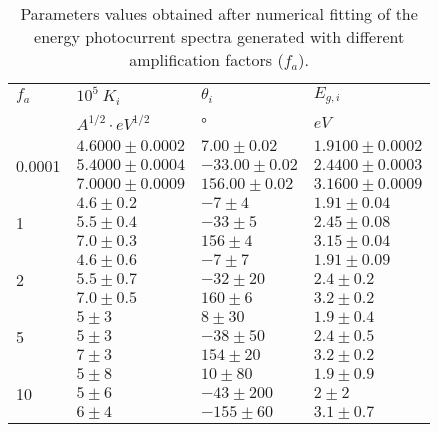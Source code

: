 \begin{table}[thb]
\small
\centering
\begin{tabular}{ p{1cm}|p{}|p{}| p{}}
\toprule
 $f_a$ & $10^5 \ K_i$ & $\theta _i$ &  $E_{g,i}$\\
 & $A^{1/2} \cdot eV^{1/2}$ & ° & $eV$\\
\midrule
\multirow{3}{*}{0.0001} & $4.6000 \pm 0.0002$    & $7.00 \pm 0.02$ &   $1.9100 \pm 0.0002$\\
                                   & $5.4000 \pm 0.0004$    & $-33.00 \pm 0.02$ &   $2.4400 \pm 0.0003$\\
                                   & $7.0000 \pm 0.0009$    & $156.00 \pm 0.02$ &   $3.1600 \pm 0.0009$\\
                                   
\midrule
\multirow{3}{*}{1}        & $4.6 \pm 0.2$    & $-7 \pm 4$ &   $1.91 \pm 0.04$\\
                                   & $5.5 \pm 0.4$    & $-33 \pm 5$ &   $2.45 \pm 0.08$\\
                                   & $7.0 \pm 0.3$    & $156 \pm 4$ &   $3.15 \pm 0.04$\\
                                  
\midrule
\multirow{3}{*}{2}        & $4.6 \pm 0.6$    & $-7 \pm 7$ &   $1.91 \pm 0.09$\\
                                   & $5.5 \pm 0.7$    & $-32 \pm 20$ &   $2.4 \pm 0.2$\\
                                   & $7.0 \pm 0.5$    & $160 \pm 6$ &   $3.2 \pm 0.2$\\      
                                   
\midrule
\multirow{3}{*}{5}        & $5 \pm 3$    & $8 \pm 30$ &   $1.9 \pm 0.4$\\
                                   & $5 \pm 3$    & $-38 \pm 50$ &   $2.4 \pm 0.5$\\
                                   & $7 \pm 3$    & $154 \pm 20$ &   $3.2 \pm 0.2$\\        
                                   
\midrule
\multirow{3}{*}{10}        & $5 \pm 8$    & $10 \pm 80$ &   $1.9 \pm 0.9$\\
                                   & $5 \pm 6$    & $-43 \pm 200$ &   $2 \pm 2$\\
                                   & $6 \pm 4$    & $-155 \pm 60$ &   $3.1 \pm 0.7$\\                                   


\bottomrule
\end{tabular}
\caption{Parameters values obtained after numerical fitting of the energy 
photocurrent spectra generated with different amplification factors ($f_a$).}
\label{table:result_fit_noise}
\end{table}
 
